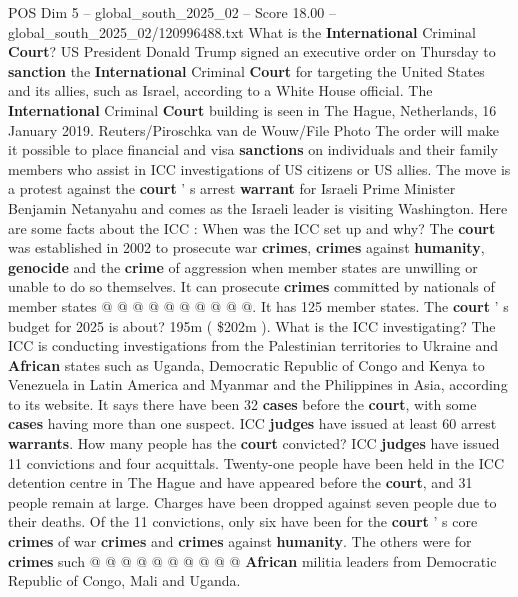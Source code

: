 \begin{textsample}{POS Dim 5 – global\_south\_2025\_02 – Score 18.00 – global\_south\_2025\_02/120996488.txt}  \label{ex:f5_pos_211}
What is the \textbf{International} Criminal \textbf{Court}?
US President Donald Trump signed an executive order on Thursday to \textbf{sanction} the \textbf{International} Criminal \textbf{Court} for targeting the United States and its allies, such as Israel, according to a White House official.
The \textbf{International} Criminal \textbf{Court} building is seen in The Hague, Netherlands, 16 January 2019.
Reuters/Piroschka van de Wouw/File Photo The order will make it possible to place financial and visa \textbf{sanctions} on individuals and their family members who assist in ICC investigations of US citizens or US allies.
The move is a protest against the \textbf{court} ' s arrest \textbf{warrant} for Israeli Prime Minister Benjamin Netanyahu and comes as the Israeli leader is visiting Washington.
Here are some facts about the ICC : When was the ICC set up and why?
The \textbf{court} was established in 2002 to prosecute war \textbf{crimes}, \textbf{crimes} against \textbf{humanity}, \textbf{genocide} and the \textbf{crime} of aggression when member states are unwilling or unable to do so themselves.
It can prosecute \textbf{crimes} committed by nationals of member states @ @ @ @ @ @ @ @ @ @.
It has 125 member states.
The \textbf{court} ' s budget for 2025 is about? 195m ( \$202m ).
What is the ICC investigating?
The ICC is conducting investigations from the Palestinian territories to Ukraine and \textbf{African} states such as Uganda, Democratic Republic of Congo and Kenya to Venezuela in Latin America and Myanmar and the Philippines in Asia, according to its website.
It says there have been 32 \textbf{cases} before the \textbf{court}, with some \textbf{cases} having more than one suspect.
ICC \textbf{judges} have issued at least 60 arrest \textbf{warrants}.
How many people has the \textbf{court} convicted?
ICC \textbf{judges} have issued 11 convictions and four acquittals.
Twenty-one people have been held in the ICC detention centre in The Hague and have appeared before the \textbf{court}, and 31 people remain at large.
Charges have been dropped against seven people due to their deaths.
Of the 11 convictions, only six have been for the \textbf{court} ' s core \textbf{crimes} of war \textbf{crimes} and \textbf{crimes} against \textbf{humanity}.
The others were for \textbf{crimes} such @ @ @ @ @ @ @ @ @ @ \textbf{African} militia leaders from Democratic Republic of Congo, Mali and Uganda.

\end{textsample}
